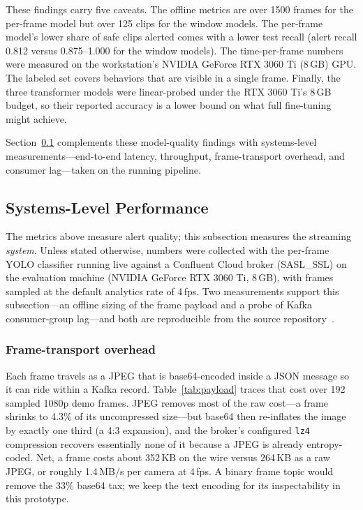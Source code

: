 \documentclass[conference]{IEEEtran}
\begin{document}
These findings carry five caveats. The offline metrics are over 1500
frames for the per-frame model but over 125 clips for the window models.
The per-frame model's lower share of safe clips alerted comes with a
lower test recall (alert recall 0.812 versus 0.875--1.000 for the window
models). The time-per-frame numbers were measured on the workstation's
NVIDIA GeForce RTX 3060 Ti (8\,GB) GPU. The labeled set covers behaviors that
are visible in a single
frame. Finally, the three transformer models were linear-probed under the
RTX 3060 Ti's 8\,GB budget, so their reported accuracy is a lower bound on what full
fine-tuning might achieve.

Section~\ref{subsec:systems} complements these model-quality findings with
systems-level measurements---end-to-end latency, throughput, frame-transport
overhead, and consumer lag---taken on the running pipeline.

\subsection{Systems-Level Performance}
\label{subsec:systems}

The metrics above measure alert quality; this subsection measures the streaming
\emph{system}. Unless stated otherwise, numbers were collected with the per-frame
YOLO classifier running live against a Confluent Cloud broker (SASL\_SSL) on the
evaluation machine (NVIDIA GeForce RTX 3060 Ti, 8\,GB), with frames sampled at the default analytics
rate of 4\,fps. Two measurements support this subsection---an offline sizing of
the frame payload and a probe of Kafka consumer-group lag---and both are
reproducible from the source repository~\cite{b14}.

\subsubsection{Frame-transport overhead}
Each frame travels as a JPEG that is base64-encoded inside a JSON message so it
can ride within a Kafka record. Table~\ref{tab:payload} traces that cost over 192
sampled 1080p demo frames. JPEG removes most of the raw cost---a frame shrinks to
4.3\% of its uncompressed size---but base64 then re-inflates the image by exactly
one third (a 4:3 expansion), and the broker's configured \texttt{lz4} compression
recovers essentially none of it because a JPEG is already entropy-coded. Net, a
frame costs about 352\,KB on the wire versus 264\,KB as a raw JPEG, or roughly
1.4\,MB/s per camera at 4\,fps. A binary frame topic would remove the 33\% base64
tax; we keep the text encoding for its inspectability in this prototype.
\end{document}
